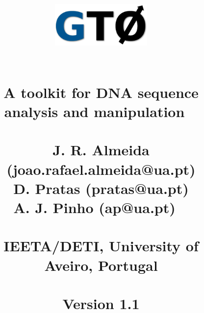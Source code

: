\documentclass[11pt,journal,compsoc]{report}[1]
\begin{document}
\title{
%
\begin{figure}[h!]
\centerline{\includegraphics[width=5cm]{../imgs/logo.pdf}}
\label{logo}
\end{figure}
~\\
\textbf{A toolkit for DNA sequence\\ analysis and manipulation}
~\\~\\
\large
J. R. Almeida (joao.rafael.almeida@ua.pt)\\
D. Pratas (pratas@ua.pt)\\
A. J. Pinho (ap@ua.pt)
~\\~\\
\small
IEETA/DETI, University of Aveiro, Portugal\\
~\\
Version 1.1
}
\date{}
\maketitle

\tableofcontents

\def \FASTQToolsPath {sections/FASTQ_tools}
\def \FASTAToolsPath {sections/FASTA_tools}








\end{document}
